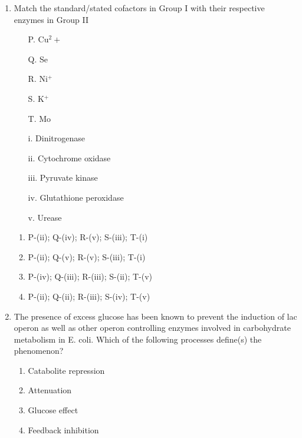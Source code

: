 \documentclass[journal,12pt,onecolumn]{IEEEtran}
\begin{document}
\begin{enumerate}
    \item \begin{minipage}{0.45\textwidth}
    Match the standard/stated cofactors in Group I with their respective enzymes in Group II
    \begin{itemize}
        \item[P.] Cu$^2+$
        \item[Q.] Se
        \item[R.] Ni$^+$
        \item[S.] K$^+$
        \item[T.] Mo
    \end{itemize}
    \end{minipage}
    \begin{minipage}{0.45\textwidth}
    \begin{itemize}
        \item[i.] Dinitrogenase
        \item[ii.] Cytochrome oxidase
        \item[iii.] Pyruvate kinase
        \item[iv.] Glutathione peroxidase
        \item[v.] Urease
    \end{itemize}
    \end{minipage}
    \begin{enumerate}
        \item P-(ii); Q-(iv); R-(v); S-(iii); T-(i)
        \item P-(ii); Q-(v); R-(v); S-(iii); T-(i)
        \item P-(iv); Q-(iii); R-(iii); S-(ii); T-(v)
        \item P-(ii); Q-(ii); R-(iii); S-(iv); T-(v)
    \end{enumerate}

    \item The presence of excess glucose has been known to prevent the induction of lac operon as well as other operon controlling enzymes involved in carbohydrate metabolism in E. coli. Which of the following processes define(s) the phenomenon?
    \begin{enumerate}
        \item Catabolite repression
        \item Attenuation
        \item Glucose effect
        \item Feedback inhibition
    \end{enumerate}


\end{enumerate}
\end{document}
